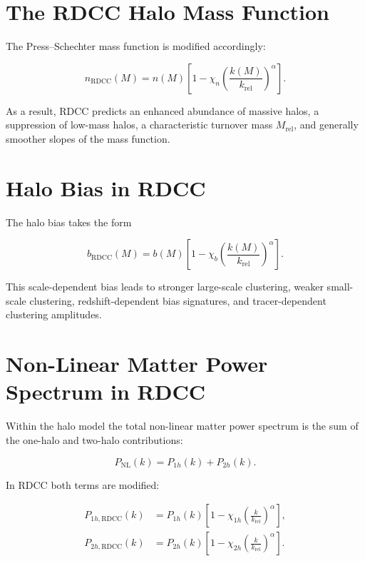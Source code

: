 \documentclass[11pt,a4paper]{article}
\begin{document}
\section{The RDCC Halo Mass Function}

The Press–Schechter mass function is modified accordingly:

\begin{equation}
    n_{\mathrm{RDCC}}(M)
    = n(M)
      \left[1 - \chi_{n}
      \left(\frac{k(M)}{k_{\mathrm{rel}}}\right)^{\alpha}\right].
\end{equation}

As a result, RDCC predicts an enhanced abundance of massive halos, a suppression of low-mass halos, a characteristic turnover mass \(M_{\mathrm{rel}}\), and generally smoother slopes of the mass function.
\section{Halo Bias in RDCC}

The halo bias takes the form

\begin{equation}
    b_{\mathrm{RDCC}}(M)
    = b(M)
      \left[1 - \chi_{b}
      \left(\frac{k(M)}{k_{\mathrm{rel}}}\right)^{\alpha}\right].
\end{equation}

This scale-dependent bias leads to stronger large-scale clustering, weaker small-scale clustering, redshift-dependent bias signatures, and tracer-dependent clustering amplitudes.

\section{Non-Linear Matter Power Spectrum in RDCC}

Within the halo model the total non-linear matter power spectrum is the sum of the one-halo and two-halo contributions:

\begin{equation}
    P_{\mathrm{NL}}(k) = P_{1h}(k) + P_{2h}(k).
\end{equation}

In RDCC both terms are modified:

\begin{align}
    P_{1h,\mathrm{RDCC}}(k)
    &= P_{1h}(k)
       \left[1 - \chi_{1h}
       \left(\frac{k}{k_{\mathrm{rel}}}\right)^{\alpha}\right], \\
    P_{2h,\mathrm{RDCC}}(k)
    &= P_{2h}(k)
       \left[1 - \chi_{2h}
       \left(\frac{k}{k_{\mathrm{rel}}}\right)^{\alpha}\right].
\end{align}
\end{document}
